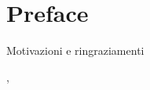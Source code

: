 
\chapter{Preface}
Motivazioni e ringraziamenti
\begin{flushright}
	{ \THauthor }
\end{flushright}
\begin{flushleft}
	{ \THplace, \THdate }
\end{flushleft}


